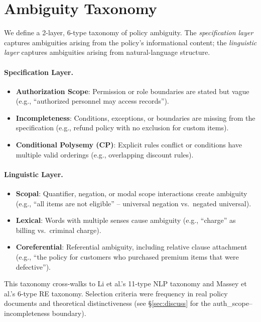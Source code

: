 \documentclass[11pt]{article}
\begin{document}
\section{Ambiguity Taxonomy}
\label{sec:taxonomy}

We define a 2-layer, 6-type taxonomy of policy ambiguity. The \emph{specification layer} captures ambiguities arising from the policy's informational content; the \emph{linguistic layer} captures ambiguities arising from natural-language structure.

\paragraph{Specification Layer.}
\begin{itemize}
\item \textbf{Authorization Scope}: Permission or role boundaries are stated but vague (e.g., ``authorized personnel may access records'').
\item \textbf{Incompleteness}: Conditions, exceptions, or boundaries are missing from the specification (e.g., refund policy with no exclusion for custom items).
\item \textbf{Conditional Polysemy (CP)}: Explicit rules conflict or conditions have multiple valid orderings (e.g., overlapping discount rules).
\end{itemize}

\paragraph{Linguistic Layer.}
\begin{itemize}
\item \textbf{Scopal}: Quantifier, negation, or modal scope interactions create ambiguity (e.g., ``all items are not eligible'' -- universal negation vs.\ negated universal).
\item \textbf{Lexical}: Words with multiple senses cause ambiguity (e.g., ``charge'' as billing vs.\ criminal charge).
\item \textbf{Coreferential}: Referential ambiguity, including relative clause attachment (e.g., ``the policy for customers who purchased premium items that were defective'').
\end{itemize}

This taxonomy cross-walks to Li et al.'s 11-type NLP taxonomy and Massey et al.'s 6-type RE taxonomy. Selection criteria were frequency in real policy documents and theoretical distinctiveness (see \S\ref{sec:discuss} for the auth\_scope--incompleteness boundary).
\end{document}
